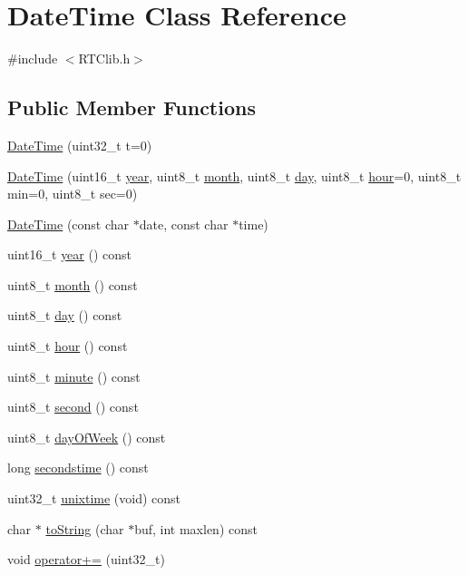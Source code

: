 \hypertarget{class_date_time}{}\section{Date\+Time Class Reference}
\label{class_date_time}


{\ttfamily \#include $<$R\+T\+Clib.\+h$>$}

\subsection*{Public Member Functions}
\begin{DoxyCompactItemize}
\item 
\hyperlink{class_date_time_af42f356752ec542faf262f485bd44a0b}{Date\+Time} (uint32\+\_\+t t=0)
\item 
\hyperlink{class_date_time_aad62a6709a1e65e6860b1efaf8c347e9}{Date\+Time} (uint16\+\_\+t \hyperlink{class_date_time_a019cf3799acc8c9a44fdc501fce33881}{year}, uint8\+\_\+t \hyperlink{class_date_time_a58beb18aec346e7081d02a2962032a43}{month}, uint8\+\_\+t \hyperlink{class_date_time_a0cedf8c399d4a38df0b8b8c4049bbac4}{day}, uint8\+\_\+t \hyperlink{class_date_time_a71816802ff06e06d53ae3e7f420f0196}{hour}=0, uint8\+\_\+t min=0, uint8\+\_\+t sec=0)
\item 
\hyperlink{class_date_time_aabeb5303c98a004439fe337bb5f5da63}{Date\+Time} (const char $\ast$date, const char $\ast$time)
\item 
uint16\+\_\+t \hyperlink{class_date_time_a019cf3799acc8c9a44fdc501fce33881}{year} () const 
\item 
uint8\+\_\+t \hyperlink{class_date_time_a58beb18aec346e7081d02a2962032a43}{month} () const 
\item 
uint8\+\_\+t \hyperlink{class_date_time_a0cedf8c399d4a38df0b8b8c4049bbac4}{day} () const 
\item 
uint8\+\_\+t \hyperlink{class_date_time_a71816802ff06e06d53ae3e7f420f0196}{hour} () const 
\item 
uint8\+\_\+t \hyperlink{class_date_time_a9990c5958c55b3aa7018e21df9d490e5}{minute} () const 
\item 
uint8\+\_\+t \hyperlink{class_date_time_a9b9a89a83e823b4a55e731d2b2d82f60}{second} () const 
\item 
uint8\+\_\+t \hyperlink{class_date_time_a4f3e0999a04238348adf390c29b889f9}{day\+Of\+Week} () const 
\item 
long \hyperlink{class_date_time_a6dd7642f7f7a2d7ff7aec465bbc78187}{secondstime} () const 
\item 
uint32\+\_\+t \hyperlink{class_date_time_afb578f26cf9eddc7d6a0891021ee77f3}{unixtime} (void) const 
\item 
char $\ast$ \hyperlink{class_date_time_a839ec24c6bec99875ac7336deed49ac7}{to\+String} (char $\ast$buf, int maxlen) const 
\item 
void \hyperlink{class_date_time_a87adbc2ee0bfcb9417ffeadca2e3f375}{operator+=} (uint32\+\_\+t)
\end{DoxyCompactItemize}
